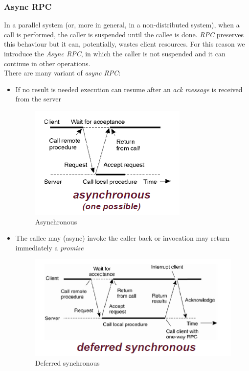 \subsubsection{Async RPC}
In a parallel system (or, more in general, in a non-distributed system), when a call is performed, the caller is suspended until the callee is done. \textit{RPC} preserves this behaviour but it can, potentially, wastes client resources.
For this reason we introduce the \textit{Async RPC}, in which the caller is not suspended and it can continue in other operations.\\
There are many variant of \textit{async RPC}:
\begin{itemize}
    \item If no result is needed execution can resume after an \textit{ack message} is received from the server
    \begin{figure}[h]
        \caption{Asynchronous}
        \includegraphics[scale=0.6]{src/images/async.png}
        \centering
    \end{figure}

    \item The callee may (async) invoke the caller back or invocation may return immediately a \textit{promise}
    \begin{figure}[h]
        \caption{Deferred synchronous}
        \includegraphics[scale=0.6]{src/images/deferred-synchronous.png}
        \centering
    \end{figure}
\end{itemize}

